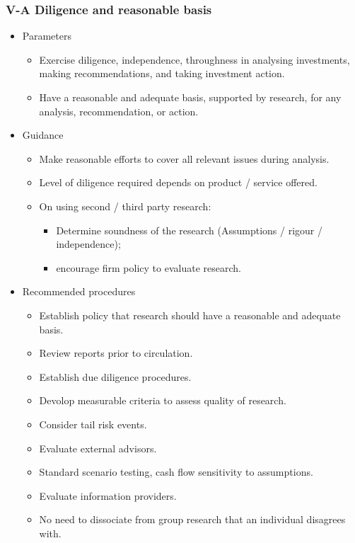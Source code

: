 \documentclass[../notes_compiled.tex]{subfiles}
\begin{document}
\subsubsection{V-A Diligence and reasonable basis}
\begin{itemize}
\item Parameters
\begin{itemize}
\item Exercise diligence, independence, throughness in analysing investments, making recommendations, and taking investment action.
\item Have a reasonable and adequate basis, supported by research, for any analysis, recommendation, or action.
\end{itemize}
\item Guidance
\begin{itemize}
\item Make reasonable efforts to cover all relevant issues during analysis.
\item Level of diligence required depends on product / service offered.
\item On using second / third party research:
\begin{itemize}
\item Determine soundness of the research (Assumptions / rigour / independence);
\item encourage firm policy to evaluate research.
\end{itemize}
\end{itemize}
\item Recommended procedures
\begin{itemize}
\item Establish policy that research should have a reasonable and adequate basis.
\item Review reports prior to circulation.
\item Establish due diligence procedures.
\item Devolop measurable criteria to assess quality of research.
\item Consider tail risk events.
\item Evaluate external advisors.
\item Standard scenario testing, cash flow sensitivity to assumptions.
\item Evaluate information providers.
\item No need to dissociate from group research that an individual disagrees with.
\end{itemize}
\end{itemize}
\end{document}
